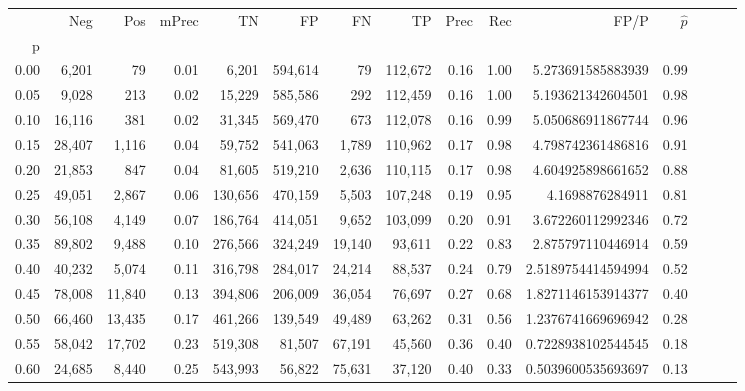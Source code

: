 \begin{tabular}{rrrrrrrrrrrrrrr}
\toprule
{} &     Neg &     Pos & mPrec &       TN &       FP &       FN &       TP &  Prec &   Rec &                  FP/P & $\hat{p}$ \\
p    &         &         &       &          &          &          &          &       &       &                       &           \\
\midrule
0.00 &   6,201 &      79 &  0.01 &    6,201 &  594,614 &       79 &  112,672 &  0.16 &  1.00 &     5.273691585883939 &      0.99 \\
0.05 &   9,028 &     213 &  0.02 &   15,229 &  585,586 &      292 &  112,459 &  0.16 &  1.00 &     5.193621342604501 &      0.98 \\
0.10 &  16,116 &     381 &  0.02 &   31,345 &  569,470 &      673 &  112,078 &  0.16 &  0.99 &     5.050686911867744 &      0.96 \\
0.15 &  28,407 &   1,116 &  0.04 &   59,752 &  541,063 &    1,789 &  110,962 &  0.17 &  0.98 &     4.798742361486816 &      0.91 \\
0.20 &  21,853 &     847 &  0.04 &   81,605 &  519,210 &    2,636 &  110,115 &  0.17 &  0.98 &     4.604925898661652 &      0.88 \\
0.25 &  49,051 &   2,867 &  0.06 &  130,656 &  470,159 &    5,503 &  107,248 &  0.19 &  0.95 &       4.1698876284911 &      0.81 \\
0.30 &  56,108 &   4,149 &  0.07 &  186,764 &  414,051 &    9,652 &  103,099 &  0.20 &  0.91 &     3.672260112992346 &      0.72 \\
0.35 &  89,802 &   9,488 &  0.10 &  276,566 &  324,249 &   19,140 &   93,611 &  0.22 &  0.83 &     2.875797110446914 &      0.59 \\
0.40 &  40,232 &   5,074 &  0.11 &  316,798 &  284,017 &   24,214 &   88,537 &  0.24 &  0.79 &    2.5189754414594994 &      0.52 \\
0.45 &  78,008 &  11,840 &  0.13 &  394,806 &  206,009 &   36,054 &   76,697 &  0.27 &  0.68 &    1.8271146153914377 &      0.40 \\
0.50 &  66,460 &  13,435 &  0.17 &  461,266 &  139,549 &   49,489 &   63,262 &  0.31 &  0.56 &    1.2376741669696942 &      0.28 \\
0.55 &  58,042 &  17,702 &  0.23 &  519,308 &   81,507 &   67,191 &   45,560 &  0.36 &  0.40 &    0.7228938102544545 &      0.18 \\
0.60 &  24,685 &   8,440 &  0.25 &  543,993 &   56,822 &   75,631 &   37,120 &  0.40 &  0.33 &    0.5039600535693697 &      0.13 \\

\end{tabular}
